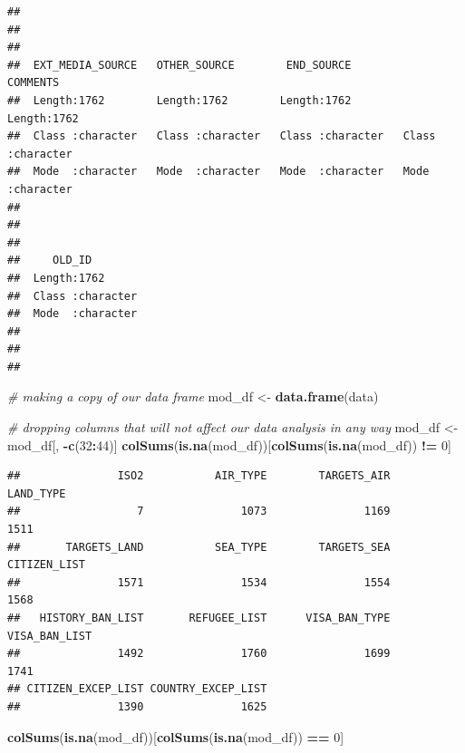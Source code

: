 \documentclass[]{article}
\newenvironment{Shaded}{\begin{snugshade}}{\end{snugshade}}
\newcommand{\CommentTok}[1]{\textcolor[rgb]{0.56,0.35,0.01}{\textit{#1}}}
\newcommand{\DecValTok}[1]{\textcolor[rgb]{0.00,0.00,0.81}{#1}}
\newcommand{\KeywordTok}[1]{\textcolor[rgb]{0.13,0.29,0.53}{\textbf{#1}}}
\newcommand{\NormalTok}[1]{#1}
\newcommand{\OperatorTok}[1]{\textcolor[rgb]{0.81,0.36,0.00}{\textbf{#1}}}
\newcommand{\StringTok}[1]{\textcolor[rgb]{0.31,0.60,0.02}{#1}}
\begin{document}
\begin{verbatim}
##                                                                 
##                                                                 
##                                                                 
##  EXT_MEDIA_SOURCE   OTHER_SOURCE        END_SOURCE          COMMENTS        
##  Length:1762        Length:1762        Length:1762        Length:1762       
##  Class :character   Class :character   Class :character   Class :character  
##  Mode  :character   Mode  :character   Mode  :character   Mode  :character  
##                                                                             
##                                                                             
##                                                                             
##     OLD_ID         
##  Length:1762       
##  Class :character  
##  Mode  :character  
##                    
##                    
## 
\end{verbatim}

\begin{Shaded}
\begin{Highlighting}[]
\CommentTok{# making a copy of our data frame}
\NormalTok{mod_df <-}\StringTok{ }\KeywordTok{data.frame}\NormalTok{(data)}

\CommentTok{# dropping columns that will not affect our data analysis in any way}
\NormalTok{mod_df <-}\StringTok{ }\NormalTok{mod_df[, }\OperatorTok{-}\KeywordTok{c}\NormalTok{(}\DecValTok{32}\OperatorTok{:}\DecValTok{44}\NormalTok{)]}
\KeywordTok{colSums}\NormalTok{(}\KeywordTok{is.na}\NormalTok{(mod_df))[}\KeywordTok{colSums}\NormalTok{(}\KeywordTok{is.na}\NormalTok{(mod_df)) }\OperatorTok{!=}\StringTok{ }\DecValTok{0}\NormalTok{]}
\end{Highlighting}
\end{Shaded}

\begin{verbatim}
##               ISO2           AIR_TYPE        TARGETS_AIR          LAND_TYPE 
##                  7               1073               1169               1511 
##       TARGETS_LAND           SEA_TYPE        TARGETS_SEA       CITIZEN_LIST 
##               1571               1534               1554               1568 
##   HISTORY_BAN_LIST       REFUGEE_LIST      VISA_BAN_TYPE      VISA_BAN_LIST 
##               1492               1760               1699               1741 
## CITIZEN_EXCEP_LIST COUNTRY_EXCEP_LIST 
##               1390               1625
\end{verbatim}

\begin{Shaded}
\begin{Highlighting}[]
\KeywordTok{colSums}\NormalTok{(}\KeywordTok{is.na}\NormalTok{(mod_df))[}\KeywordTok{colSums}\NormalTok{(}\KeywordTok{is.na}\NormalTok{(mod_df)) }\OperatorTok{==}\StringTok{ }\DecValTok{0}\NormalTok{]}
\end{Highlighting}
\end{Shaded}
\end{document}
